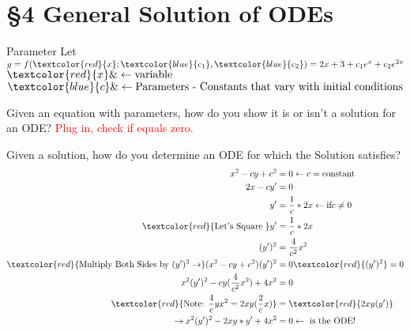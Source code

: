 \section{\S 4 General Solution of ODEs}
\begin{imp:defn}{Parameter}{} Let $y=f(\textcolor{red}{x}; \textcolor{blue}{c_1}, \textcolor{blue}{c_2}) = 2x+3+ c_1e^x+c_2e^{2x}$\\
   $ \textcolor{red}{x} \& \leftarrow \text{variable}$\\
    $\textcolor{blue}{c} \& \leftarrow \text{Parameters - Constants that vary with initial conditions}$
\end{imp:defn}
\begin{ex} Given an equation with parameters, how do you show it is or isn't a solution for an ODE? \textcolor{red}{Plug in, check if equals zero.}
\end{ex}
\begin{ex}
Given a solution, how do you determine an ODE for which the Solution satisfies?\\
\begin{align*}
    x^2-cy+c^2 &=0 \leftarrow c=\text{constant}\\
    2x-cy' &=0\\
    y' &= \frac{1}{c}*2x \leftarrow \text{if} c\neq 0\\
    \textcolor{red}{\text{Let's Square }} y'&=\frac{1}{c}*2x\\
    (y')^2&=\frac{4}{c^2}x^2\\
    \textcolor{red}{\text{Multiply Both Sides by }(y')^2 \rightarrow} (x^2-cy+c^2)(y')^2&=0\textcolor{red}{(y')^2}=0\\
    x^2(y')^2-cy(\frac{4}{c^2}x^2)+4x^2&=0\\
    \textcolor{red}{\text{Note: }\frac{4}{c}yx^2=2xy(\frac{2}{c}x)}&=\textcolor{red}{2xy(y')}\\
    \rightarrow x^2(y')^2-2xy*y'+4x^2&=0 \leftarrow \text{ is the ODE!}
\end{align*}
\end{ex}
